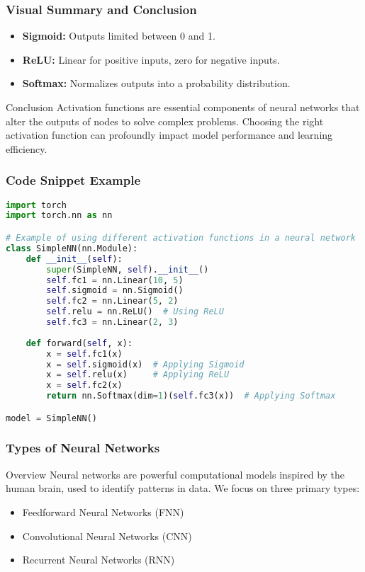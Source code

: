 \documentclass[aspectratio=169]{beamer}
\begin{document}
\begin{frame}[fragile]
    \frametitle{Visual Summary and Conclusion}
    \begin{itemize}
        \item \textbf{Sigmoid:} Outputs limited between 0 and 1.
        \item \textbf{ReLU:} Linear for positive inputs, zero for negative inputs.
        \item \textbf{Softmax:} Normalizes outputs into a probability distribution.
    \end{itemize}

    \begin{block}{Conclusion}
        Activation functions are essential components of neural networks that alter the outputs of nodes to solve complex problems. Choosing the right activation function can profoundly impact model performance and learning efficiency.
    \end{block}
\end{frame}

\begin{frame}[fragile]
    \frametitle{Code Snippet Example}
    \begin{lstlisting}[language=Python]
import torch
import torch.nn as nn

# Example of using different activation functions in a neural network
class SimpleNN(nn.Module):
    def __init__(self):
        super(SimpleNN, self).__init__()
        self.fc1 = nn.Linear(10, 5)
        self.sigmoid = nn.Sigmoid()
        self.fc2 = nn.Linear(5, 2)
        self.relu = nn.ReLU()  # Using ReLU
        self.fc3 = nn.Linear(2, 3)
        
    def forward(self, x):
        x = self.fc1(x)
        x = self.sigmoid(x)  # Applying Sigmoid
        x = self.relu(x)     # Applying ReLU
        x = self.fc2(x)
        return nn.Softmax(dim=1)(self.fc3(x))  # Applying Softmax

model = SimpleNN()
    \end{lstlisting}
\end{frame}

\begin{frame}[fragile]
    \frametitle{Types of Neural Networks}
    \begin{block}{Overview}
        Neural networks are powerful computational models inspired by the human brain, used to identify patterns in data. 
        We focus on three primary types:
        \begin{itemize}
            \item Feedforward Neural Networks (FNN)
            \item Convolutional Neural Networks (CNN)
            \item Recurrent Neural Networks (RNN)
        \end{itemize}
    \end{block}
\end{frame}
\end{document}
